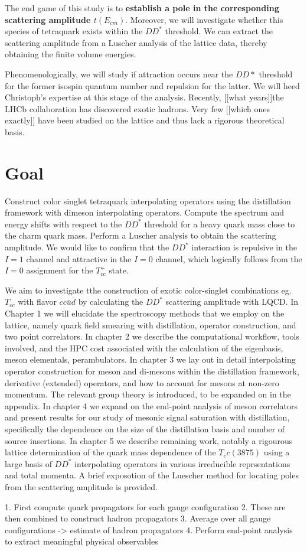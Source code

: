 The end game of this study is to \textbf{establish a pole in the corresponding scattering amplitude $t(E_{cm})$}. Moreover, we will investigate whether this species of tetraquark exists within the $DD^*$ threshold. We can extract the scattering amplitude from a Luscher analysis of the lattice data, thereby obtaining the finite volume energies. 

Phenomenologically, we will study if attraction occurs near the $DD*$ threshold for the former isospin quantum number and repulsion for the latter. We will heed  Christoph's expertise at this stage of the analysis. Recently, [[what years]]the LHCb collaboration has discovered exotic hadrons. Very few [[which ones exactly]] have been studied on the lattice and thus lack a rigorous theoretical basis.
\section{Goal}
Construct color singlet tetraquark interpolating operators using the distillation framework with dimeson interpolating operators. Compute the spectrum and energy shifts with respect to the $DD^*$ threshold for a heavy quark mass close to the charm quark mass. Perform a Luscher analysis to obtain the scattering amplitude. We would like to confirm that the $DD^*$ interaction is repulsive in the $I=1$ channel and attractive in the $I=0$ channel, which logically follows from the $I=0$ assignment for the $T_{cc}^+$ state. 

We aim to investigate tthe construction of exotic color-singlet combinations eg. $T_{cc}$ with flavor $cc\bar{u}\bar{d}$ by calculating the $DD^*$ scattering amplitude with LQCD. In Chapter 1 we will elucidate the spectroscopy methods that we employ on the lattice, namely quark field smearing with distillation, operator construction, and two point correlators. In chapter 2 we describe the computational workflow, tools involved, and the HPC cost associated with the calculation of the eigenbasis, meson elementals, perambulators. In chapter 3 we lay out in detail interpolating operator construction for meson and di-mesons within the distillation framework, derivative (extended) operators, and how to account for mesons at non-zero momentum. The relevant group theory is introduced, to be expanded on in the appendix. In chapter 4 we expand on the end-point analysis of meson correlators and present results for our study of mesonic signal saturation with distillation, specifically the dependence on the size of the distillation basis and number of source insertions. In chapter 5 we describe remaining work, notably a rigourous lattice determination of the quark mass dependence of the $T_cc(3875)$ using a large basis of $DD^*$ interpolating operators in various irreducible reprsentations and total momenta. A brief exposotion of the Luescher method for locating poles from the scattering amplitude is provided. 

1. First compute quark propagators for each gauge configuration
2. These are then combined to construct hadron propagators 
3. Average over all gauge configurations -> estimate of hadron propagators 
4. Perform end-point analysis to extract meaningful physical observables


